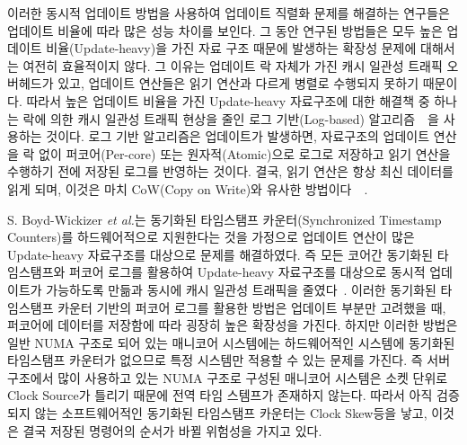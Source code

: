 이러한 동시적 업데이트 방법을 사용하여 업데이트 직렬화 문제를 해결하는 연구들은 
업데이트 비율에 따라 많은 성능 차이를 보인다.
그 동안 연구된 방법들은 모두 높은 업데이트 비율(Update-heavy)을 가진 자료 구조 때문에 발생하는 
확장성 문제에 대해서는 여전히 효율적이지 않다.
그 이유는 업데이트 락 자체가 가진 캐시 일관성 트래픽 오버헤드가 있고, 업데이트 연산들은 읽기 연산과 
다르게 병렬로 수행되지 못하기 때문이다.
따라서 높은 업데이트 비율을 가진 Update-heavy 자료구조에 대한 해결책 중 하나는 락에 의한 캐시 일관성 트래픽 
현상을 줄인 로그 기반(Log-based) 알고리즘~\cite{Hendler2010FC}~\cite{SilasBoydWickizerPth}을
사용하는 것이다.
로그 기반 알고리즘은 업데이트가 발생하면, 자료구조의 업데이트 연산을 
락 없이 퍼코어(Per-core) 또는 원자적(Atomic)으로 로그로 저장하고
읽기 연산을 수행하기 전에 저장된 로그를 반영하는 것이다.
결국, 읽기 연산은 항상 최신 데이터를 읽게 되며, 이것은 마치 CoW(Copy on Write)와
유사한 방법이다~\cite{PaulDetailLWN}~\cite{Morrison2016SSM}.

S. Boyd-Wickizer \textit{et al.}는 동기화된 타임스탬프 카운터(Synchronized Timestamp
Counters)를 하드웨어적으로 지원한다는 것을 가정으로 업데이트 연산이 많은 Update-heavy 자료구조를 
대상으로 문제를 해결하였다.
즉 모든 코어간 동기화된 타임스탬프와 퍼코어 로그를 활용하여 Update-heavy 자료구조를 대상으로 
동시적 업데이트가 가능하도록 만듦과 동시에 캐시 일관성 트래픽을 줄였다~\cite{SilasBoydWickizerPth}.
이러한 동기화된 타임스탬프 카운터 기반의 퍼코어 로그를 활용한 방법은
업데이트 부분만 고려했을 때, 퍼코어에 데이터를 저장함에 따라 굉장히 높은 확장성을 가진다.
하지만 이러한 방법은 일반 NUMA 구조로 되어 있는 매니코어 시스템에는 
하드웨어적인 시스템에 동기화된 타임스탬프 카운터가 없으므로 특정 시스템만 적용할 수 있는 문제를 가진다. 
즉 서버 구조에서 많이 사용하고 있는 NUMA 구조로 구성된 매니코어 시스템은 소켓 단위로 Clock Source가 
틀리기 때문에 전역 타임 스템프가 존재하지 않는다. 
따라서 아직 검증되지 않는 소프트웨어적인 동기화된 타임스탬프 카운터는 Clock Skew등을 낳고, 
이것은 결국 저장된 명령어의 순서가 바뀔 위험성을 가지고 있다.

